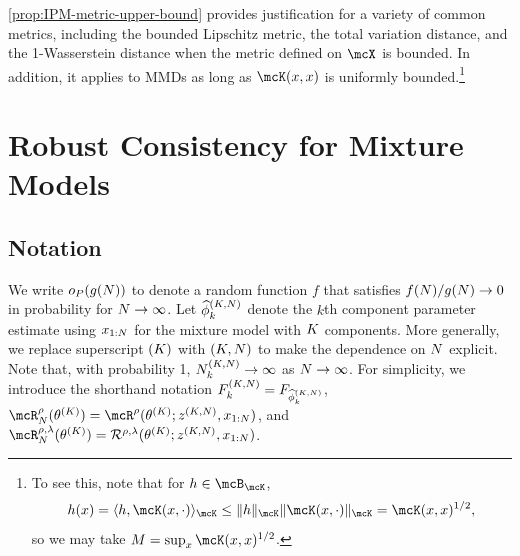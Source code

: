\cref{prop:IPM-metric-upper-bound} provides justification for a variety of common metrics, including the bounded Lipschitz metric, the total variation distance,
and the 1-Wasserstein distance when the metric defined on $\mcX$ is bounded.
In addition, it applies to MMDs as long as $\mcK(x, x)$ is uniformly bounded.\footnote{To see this, note that for $h \in \mcB_{\mcK}$,
	\begin{equation}
		h(x) = \langle h, \mcK(x, \cdot) \rangle_{\mcK} \le \Vert h \Vert_{\mcK}  \Vert \mcK(x,\cdot )\Vert_{\mcK}  = \mcK(x,x)^{1/2}, %
	\end{equation}
	so we may take $M = \sup_{x} \mcK(x,x)^{1/2}$.}



\section{Robust Consistency for Mixture Models} \label{sec:mixture-model-consistency}
\subsection{Notation}
We write $o_{P}(g(N))$ to denote a random function $f$ that satisfies $f(N) / g(N) \to 0$ in probability for $N \to \infty$.
Let $\widehat{\phi}_{k}^{(K,N)}$ denote the $k$th component parameter estimate using $x_{1:N}$
for the mixture model with $K$ components.
More generally, we replace superscript $(K)$ with $(K,N)$ to make the dependence on $N$ explicit.
Note that, with probability 1, $N^{(K,N)}_k \rightarrow \infty$ as $N \rightarrow \infty$.
For simplicity, we introduce the shorthand notation
$F^{(K,N)}_{k} = F_{\widehat{\phi}^{(K,N)}_k}$,
$\mcR^{\rho}_{\numobs} (\allparam^{(\numcomps)}) = \mcR^{\rho}(\allparam^{(\numcomps)}; z^{(\numcomps,\numobs)}, \data{1:\numobs})$, and
$\mcR^{\rho,\lambda}_{\numobs}(\allparam^{(\numcomps)}) = \mathcal{R}^{\rho,\lambda}(\allparam^{(\numcomps)}; z^{(\numcomps,\numobs)}, \data{1:\numobs})$.

